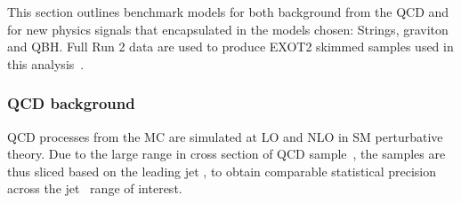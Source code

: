 This section outlines benchmark models for both background from the QCD and for new
physics signals that encapsulated in the models chosen: Strings, graviton and QBH.
Full Run 2 data are used to produce EXOT2 skimmed samples used in this analysis~\cite{ATLAS:Exot2Derivation}.

\subsubsection{QCD background}
\label{qcdsamps}

QCD processes from the MC are simulated at LO and NLO in SM perturbative theory. Due to the large range in cross section of QCD sample~\cite{Marshall:2016630}, the samples are thus sliced based on the leading jet \pt,  to obtain comparable statistical precision across the jet \pt~range of interest.



%
%
%
%

